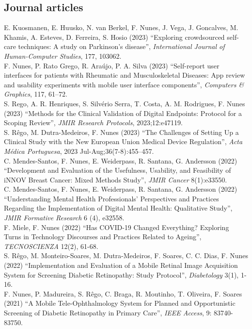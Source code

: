 \documentclass[11pt, a4paper]{article} %
\newcommand{\years}[1]{\marginnote{\scriptsize #1}} %
\begin{document}
\subsection*{Journal articles}
\years{2023}E. Kuosmanen, E. Huusko, N. van Berkel, F. Nunes, J. Vega, J. Goncalves, M. Khamis, A. Esteves, D. Ferreira, S. Hosio (2023) ``Exploring crowdsourced self-care techniques: A study on Parkinson's disease'', \emph{International Journal of Human-Computer Studies}, 177, 103062.\\
\years{2023}F. Nunes, P. Rato Grego, R. Araújo, P. A. Silva (2023) ``Self-report user interfaces for patients with Rheumatic and Musculoskeletal Diseases: App review and usability experiments with mobile user interface components'', \emph{Computers \& Graphics}, 117, 61--72.\\
\years{2023}S. Rego, A. R. Henriques, S. Silvério Serra, T. Costa, A. M. Rodrigues, F. Nunes (2023) ``Methods for the Clinical Validation of Digital Endpoints: Protocol for a Scoping Review'', \emph{JMIR Research Protocols}, 2023;12:e47119.\\
\years{2023}S. Rêgo, M. Dutra-Medeiros, F. Nunes (2023) ``The Challenges of Setting Up a Clinical Study with the New European Union Medical Device Regulation'', \emph{Acta Médica Portuguesa}, 2023 Jul-Aug;36(7-8):455--457.\\
\years{2022}C. Mendes-Santos, F. Nunes, E. Weiderpass, R. Santana, G. Andersson (2022) ``Development and Evaluation of the Usefulness, Usability, and Feasibility of iNNOV Breast Cancer: Mixed Methods Study'', \emph{JMIR Cancer} 8(1):e33550.\\
\years{2022}C. Mendes-Santos, F. Nunes, E. Weiderpass, R. Santana, G. Andersson (2022) ``Understanding Mental Health Professionals' Perspectives and Practices Regarding the Implementation of Digital Mental Health: Qualitative Study'', \emph{JMIR Formative Research} 6 (4), e32558.\\
\years{2022}F. Miele, F. Nunes (2022) ``Has COVID-19 Changed Everything? Exploring Turns in Technology Discourses and Practices Related to Ageing'', \emph{TECNOSCIENZA} 12(2), 61-68.\\
\years{2022}S. Rêgo, M. Monteiro-Soares, M. Dutra-Medeiros, F. Soares, C. C. Dias, F. Nunes (2022) ``Implementation and Evaluation of a Mobile Retinal Image Acquisition System for Screening Diabetic Retinopathy: Study Protocol'', \emph{Diabetology} 3(1), 1-16.\\
\years{2021}F. Nunes, P. Madureira, S. Rêgo, C. Braga, R. Moutinho, T. Oliveira, F. Soares (2021) ``A Mobile Tele-Ophthalmology System for Planned and Opportunistic Screening of Diabetic Retinopathy in Primary Care'', \emph{IEEE Access}, 9: 83740-83750.\\
\end{document}
